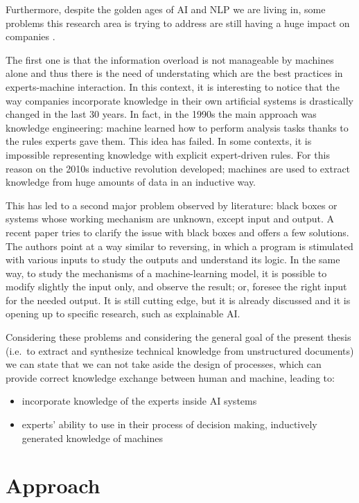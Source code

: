 \documentclass[b5paper,]{book}
\theoremstyle{definition}
\theoremstyle{definition}
\theoremstyle{definition}
\theoremstyle{remark}
\begin{document}
Furthermore, despite the golden ages of AI and NLP we are living in,
some problems this research area is trying to address are still having a
huge impact on companies \citep{hand2007principles, mining2006data}.

The first one is that the information overload is not manageable by
machines alone and thus there is the need of understating which are the
best practices in experts-machine interaction. In this context, it is
interesting to notice that the way companies incorporate knowledge in
their own artificial systems is drastically changed in the last 30
years. In fact, in the 1990s the main approach was knowledge
engineering: machine learned how to perform analysis tasks thanks to the
rules experts gave them. This idea has failed. In some contexts, it is
impossible representing knowledge with explicit expert-driven rules. For
this reason on the 2010s inductive revolution developed; machines are
used to extract knowledge from huge amounts of data in an inductive way.

This has led to a second major problem observed by literature: black
boxes or systems whose working mechanism are unknown, except input and
output. A recent paper \citep{pedreschi2018open} tries to clarify the
issue with black boxes and offers a few solutions. The authors point at
a way similar to reversing, in which a program is stimulated with
various inputs to study the outputs and understand its logic. In the
same way, to study the mechanisms of a machine-learning model, it is
possible to modify slightly the input only, and observe the result; or,
foresee the right input for the needed output. It is still cutting edge,
but it is already discussed and it is opening up to specific research,
such as explainable AI.

Considering these problems and considering the general goal of the
present thesis (i.e.~to extract and synthesize technical knowledge from
unstructured documents) we can state that we can not take aside the
design of processes, which can provide correct knowledge exchange
between human and machine, leading to:

\begin{itemize}
\item
  incorporate knowledge of the experts inside AI systems
\item
  experts' ability to use in their process of decision making,
  inductively generated knowledge of machines
\end{itemize}

\chapter{Approach}\label{approach}
\end{document}
